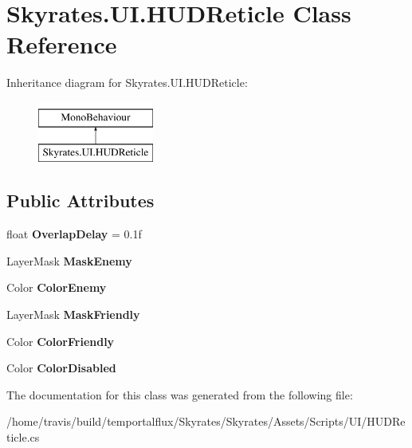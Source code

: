 \hypertarget{class_skyrates_1_1_u_i_1_1_h_u_d_reticle}{\section{Skyrates.\-U\-I.\-H\-U\-D\-Reticle Class Reference}
\label{class_skyrates_1_1_u_i_1_1_h_u_d_reticle}
}
Inheritance diagram for Skyrates.\-U\-I.\-H\-U\-D\-Reticle\-:\begin{figure}[H]
\begin{center}
\leavevmode
\includegraphics[height=2.000000cm]{class_skyrates_1_1_u_i_1_1_h_u_d_reticle}
\end{center}
\end{figure}
\subsection*{Public Attributes}
\begin{DoxyCompactItemize}
\item 
\hypertarget{class_skyrates_1_1_u_i_1_1_h_u_d_reticle_a5c693709ed1cf6c036b82464cdab2f3e}{float {\bfseries Overlap\-Delay} = 0.\-1f}\label{class_skyrates_1_1_u_i_1_1_h_u_d_reticle_a5c693709ed1cf6c036b82464cdab2f3e}

\item 
\hypertarget{class_skyrates_1_1_u_i_1_1_h_u_d_reticle_ac390f6a17915cc80535bddabe515b78a}{Layer\-Mask {\bfseries Mask\-Enemy}}\label{class_skyrates_1_1_u_i_1_1_h_u_d_reticle_ac390f6a17915cc80535bddabe515b78a}

\item 
\hypertarget{class_skyrates_1_1_u_i_1_1_h_u_d_reticle_ad9d3045cd3021e5946ee06bda1132004}{Color {\bfseries Color\-Enemy}}\label{class_skyrates_1_1_u_i_1_1_h_u_d_reticle_ad9d3045cd3021e5946ee06bda1132004}

\item 
\hypertarget{class_skyrates_1_1_u_i_1_1_h_u_d_reticle_a9d8a9c93e75d4e4dc0365494867a1c30}{Layer\-Mask {\bfseries Mask\-Friendly}}\label{class_skyrates_1_1_u_i_1_1_h_u_d_reticle_a9d8a9c93e75d4e4dc0365494867a1c30}

\item 
\hypertarget{class_skyrates_1_1_u_i_1_1_h_u_d_reticle_a0c6cdf22007f96e5da8259eb3eee6ded}{Color {\bfseries Color\-Friendly}}\label{class_skyrates_1_1_u_i_1_1_h_u_d_reticle_a0c6cdf22007f96e5da8259eb3eee6ded}

\item 
\hypertarget{class_skyrates_1_1_u_i_1_1_h_u_d_reticle_ab4a50ede4df66b95a39c05bd02c78bb6}{Color {\bfseries Color\-Disabled}}\label{class_skyrates_1_1_u_i_1_1_h_u_d_reticle_ab4a50ede4df66b95a39c05bd02c78bb6}

\end{DoxyCompactItemize}


The documentation for this class was generated from the following file\-:\begin{DoxyCompactItemize}
\item 
/home/travis/build/temportalflux/\-Skyrates/\-Skyrates/\-Assets/\-Scripts/\-U\-I/H\-U\-D\-Reticle.\-cs\end{DoxyCompactItemize}
